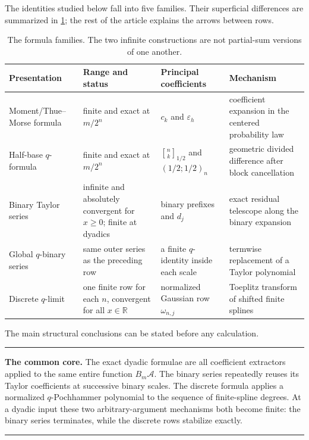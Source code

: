 \documentclass[11pt,oneside]{article}
\theoremstyle{definition}
\theoremstyle{remark}
\newcommand{\R}{\mathbb R}
\newcommand{\qbinom}[3]{\genfrac{[}{]}{0pt}{}{#1}{#2}_{#3}}
\newcommand{\tm}{\varepsilon}
\newenvironment{boxedremark}{%
  \par\smallskip\noindent\begin{center}\begin{minipage}{0.94\textwidth}%
  \color{black}\hrule\vspace{0.6em}\small
}{%
  \vspace{0.6em}\hrule\end{minipage}\end{center}\smallskip
}
\begin{document}
The identities studied below fall into five families.  Their superficial differences are
summarized in \cref{tab:formula-map}; the rest of the article explains the arrows between
rows.

\begin{table}[ht]
\centering
\small
\begin{tabularx}{\textwidth}{@{}>{\raggedright\arraybackslash}p{}
>{\raggedright\arraybackslash}p{}
>{\raggedright\arraybackslash}p{}X@{}}
\toprule
Presentation & Range and status & Principal coefficients & Mechanism \\
\midrule
Moment/Thue--Morse formula & finite and exact at $m/2^n$ & $c_k$ and $\tm_h$ & coefficient expansion in the centered probability law \\
Half-base $q$-formula & finite and exact at $m/2^n$ & $\qbinom nk{1/2}$ and $(1/2;1/2)_n$ & geometric divided difference after block cancellation \\
Binary Taylor series & infinite and absolutely convergent for $x\ge0$; finite at dyadics & binary prefixes and $d_j$ & exact residual telescope along the binary expansion \\
Global $q$-binary series & same outer series as the preceding row & a finite $q$-identity inside each scale & termwise replacement of a Taylor polynomial \\
Discrete $q$-limit & one finite row for each $n$, convergent for all $x\in\R$ & normalized Gaussian row $\omega_{n,j}$ & Toeplitz transform of shifted finite splines \\
\bottomrule
\end{tabularx}
\caption{The formula families.  The two infinite constructions are not partial-sum versions
of one another.}
\label{tab:formula-map}
\end{table}

The main structural conclusions can be stated before any calculation.

\begin{boxedremark}
\textbf{The common core.}
The exact dyadic formulae are all coefficient extractors applied to the same entire function
$B_m\mathscr A$.  The binary series repeatedly reuses its Taylor coefficients at successive
binary scales.  The discrete formula applies a normalized $q$-Pochhammer polynomial to the
sequence of finite-spline degrees.  At a dyadic input these two arbitrary-argument mechanisms
both become finite: the binary series terminates, while the discrete rows stabilize exactly.
\end{boxedremark}
\end{document}
